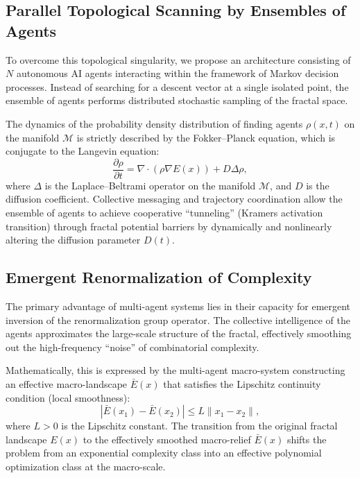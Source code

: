 \documentclass[12pt,a4paper]{article}
\begin{document}
\subsection{Parallel Topological Scanning by Ensembles of Agents}

To overcome this topological singularity, we propose an architecture consisting of $N$ autonomous AI agents interacting within the framework of Markov decision processes. Instead of searching for a descent vector at a single isolated point, the ensemble of agents performs distributed stochastic sampling of the fractal space.

The dynamics of the probability density distribution of finding agents $\rho(x,t)$ on the manifold $\mathcal{M}$ is strictly described by the Fokker–Planck equation, which is conjugate to the Langevin equation:
\begin{equation}
\frac{\partial \rho}{\partial t} = \nabla \cdot (\rho \nabla E(x)) + D \Delta \rho,
\end{equation}
where $\Delta$ is the Laplace–Beltrami operator on the manifold $\mathcal{M}$, and $D$ is the diffusion coefficient. Collective messaging and trajectory coordination allow the ensemble of agents to achieve cooperative ``tunneling'' (Kramers activation transition) through fractal potential barriers by dynamically and nonlinearly altering the diffusion parameter $D(t)$.

\subsection{Emergent Renormalization of Complexity}

The primary advantage of multi-agent systems lies in their capacity for emergent inversion of the renormalization group operator. The collective intelligence of the agents approximates the large-scale structure of the fractal, effectively smoothing out the high-frequency ``noise'' of combinatorial complexity.

Mathematically, this is expressed by the multi-agent macro-system constructing an effective macro-landscape $\bar{E}(x)$ that satisfies the Lipschitz continuity condition (local smoothness):
\begin{equation}
|\bar{E}(x_1) - \bar{E}(x_2)| \le L \|x_1 - x_2\|,
\end{equation}
where $L > 0$ is the Lipschitz constant. The transition from the original fractal landscape $E(x)$ to the effectively smoothed macro-relief $\bar{E}(x)$ shifts the problem from an exponential complexity class into an effective polynomial optimization class at the macro-scale.
\end{document}
